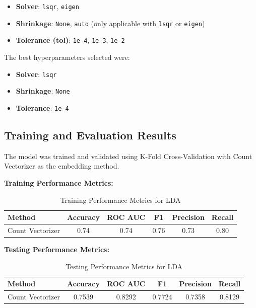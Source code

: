 \begin{itemize}
    \item \textbf{Solver}: \texttt{lsqr}, \texttt{eigen}
    \item \textbf{Shrinkage}: \texttt{None}, \texttt{auto} (only applicable with \texttt{lsqr} or \texttt{eigen})
    \item \textbf{Tolerance (tol)}: \texttt{1e-4}, \texttt{1e-3}, \texttt{1e-2}
\end{itemize}

The best hyperparameters selected were:
\begin{itemize}
    \item \textbf{Solver}: \texttt{lsqr}
    \item \textbf{Shrinkage}: \texttt{None}
    \item \textbf{Tolerance}: \texttt{1e-4}
\end{itemize}

\subsection{Training and Evaluation Results}
The model was trained and validated using K-Fold Cross-Validation with Count Vectorizer as the embedding method.

\textbf{Training Performance Metrics:}

\begin{table}[H]
    \centering
    \caption{Training Performance Metrics for LDA}
    \label{tab:lda-training-metrics}
    \begin{tabular}{|l|c|c|c|c|c|}
        \hline
        \textbf{Method} & \textbf{Accuracy} & \textbf{ROC AUC} & \textbf{F1} & \textbf{Precision} & \textbf{Recall} \\ 
        \hline
        Count Vectorizer & 0.74 & 0.74 & 0.76 & 0.73 & 0.80 \\ 
        \hline
    \end{tabular}
\end{table}

\textbf{Testing Performance Metrics:}

\begin{table}[H]
    \centering
    \caption{Testing Performance Metrics for LDA}
    \label{tab:lda-testing-metrics}
    \begin{tabular}{|l|c|c|c|c|c|}
        \hline
        \textbf{Method} & \textbf{Accuracy} & \textbf{ROC AUC} & \textbf{F1} & \textbf{Precision} & \textbf{Recall} \\ 
        \hline
        Count Vectorizer & 0.7539 & 0.8292 & 0.7724 & 0.7358 & 0.8129 \\ 
        \hline
    \end{tabular}
\end{table}

